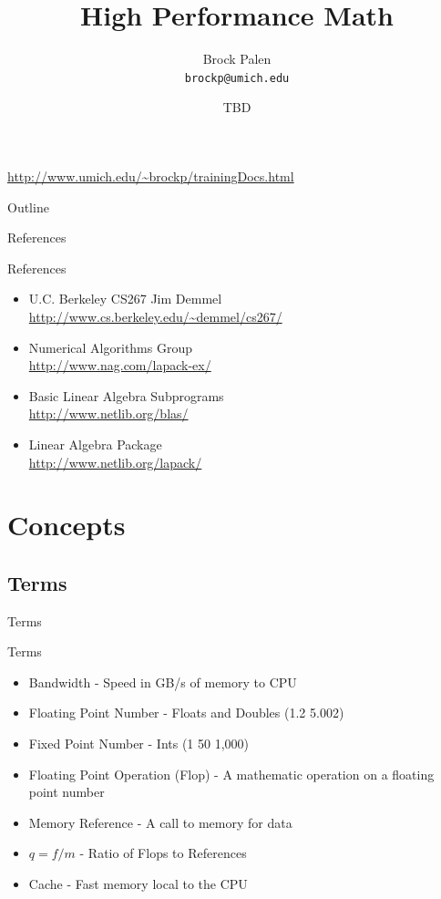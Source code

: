 \documentclass[handout]{beamer}
\title[CAC High Performance Math] {High Performance Math}
\author{Brock Palen\\ \texttt{brockp@umich.edu}}
\date{TBD}
\begin{document}
  \begin{frame}
    \titlepage
    \url{http://www.umich.edu/~brockp/trainingDocs.html}
  \end{frame}

  \begin{frame}{Outline}
    \tableofcontents
  \end{frame}
 
\begin{frame}{References}
 \begin{block}{References}
  \begin{itemize}
   \item U.C. Berkeley CS267 Jim Demmel \\
     \url{http://www.cs.berkeley.edu/~demmel/cs267/}
   \item Numerical Algorithms Group     \\
     \url{http://www.nag.com/lapack-ex/}
   \item Basic Linear Algebra Subprograms \\
     \url{http://www.netlib.org/blas/}
   \item Linear Algebra Package         \\
     \url{http://www.netlib.org/lapack/}
  \end{itemize}
 \end{block}
\end{frame} 



\section{Concepts}
\subsection{Terms}
\begin{frame}{Terms}
 \begin{block}{Terms}
  \begin{itemize}
   \item<1-> Bandwidth - Speed in GB/s of memory to CPU
   \item<2-> Floating Point Number - Floats and Doubles (1.2 5.002)
   \item<2-> Fixed Point Number - Ints (1 50 1,000)
   \item<3-> Floating Point Operation (Flop) - A mathematic operation on a floating point number
   \item<4-> Memory Reference - A call to memory for data
   \item<5->  $q=f/m$ - Ratio of Flops to References
   \item<6-> Cache - Fast memory local to the CPU
  \end{itemize}
 \end{block}
\end{frame}
\end{document}
